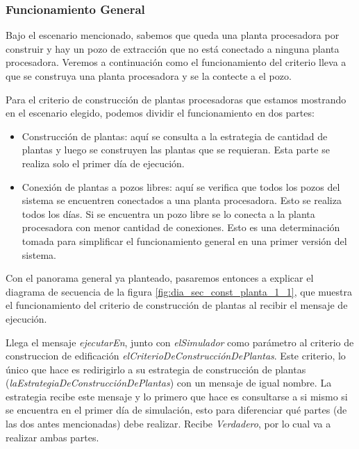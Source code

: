 \subsubsection{Funcionamiento General}
\par Bajo el escenario mencionado, sabemos que queda una planta procesadora por construir y hay un pozo de extracción que no está conectado a ninguna planta procesadora. Veremos a continuación como el funcionamiento del criterio lleva a que se construya una planta procesadora y se la contecte a el pozo.
\par Para el criterio de construcción de plantas procesadoras que estamos mostrando en el escenario elegido, podemos dividir el funcionamiento en dos partes:
\begin{itemize}
  \item Construcción de plantas: aquí se consulta a la estrategia de cantidad de plantas y luego se construyen las plantas que se requieran. Esta parte se realiza solo el primer día de ejecución.
  \item Conexión de plantas a pozos libres: aquí se verifica que todos los pozos del sistema se encuentren conectados a una planta procesadora. Esto se realiza todos los días. Si se encuentra un pozo libre se lo conecta a la planta procesadora con menor cantidad de conexiones. Esto es una determinación tomada para simplificar el funcionamiento general en una primer versión del sistema.
\end{itemize}
\par Con el panorama general ya planteado, pasaremos entonces a explicar el diagrama de secuencia de la figura \ref{fig:dia_sec_const_planta_1_1}, que muestra el funcionamiento del criterio de construcción de plantas al recibir el mensaje de ejecución.
\par Llega el mensaje \textit{ejecutarEn}, junto con \textit{elSimulador} como parámetro al criterio de construccion de edificación \textit{elCriterioDeConstrucciónDePlantas}. Este criterio, lo único que hace es redirigirlo a su estrategia de construcción de plantas (\textit{laEstrategiaDeConstrucciónDePlantas}) con un mensaje de igual nombre. La estrategia recibe este mensaje y lo primero que hace es consultarse a si mismo si se encuentra en el primer día de simulación, esto para diferenciar qué partes (de las dos antes mencionadas) debe realizar. Recibe \textit{Verdadero}, por lo cual va a realizar ambas partes.
